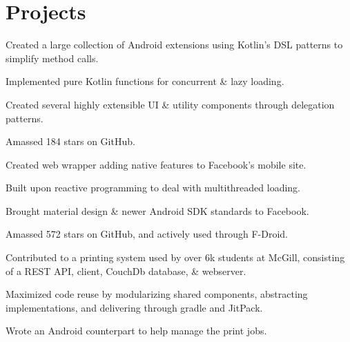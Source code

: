 \documentclass[]{allanwang-resume}
\begin{document}
\begin{minipage}[t]{0.66\textwidth}
	\sectionsep
	\section{Projects}

	\begin{tightemize}
		\item Created a large collection of Android extensions using Kotlin's DSL patterns to simplify method calls.
		\item Implemented pure Kotlin functions for concurrent \& lazy loading.
		\item Created several highly extensible UI \& utility components through delegation patterns.
		\item Amassed 184 stars on GitHub.
	\end{tightemize}

	\begin{tightemize}
		\item Created web wrapper adding native features to Facebook's mobile site.
		\item Built upon reactive programming to deal with multithreaded loading.
		\item Brought material design \& newer Android SDK standards to Facebook.
		\item Amassed 572 stars on GitHub, and actively used through F-Droid.
	\end{tightemize}

	\begin{tightemize}
		\item Contributed to a printing system used by over 6k students at McGill, consisting of a REST API, client, CouchDb database, \& webserver.
		\item Maximized code reuse by modularizing shared components, abstracting implementations, and delivering through gradle and JitPack.
		\item Wrote an Android counterpart to help manage the print jobs.
	\end{tightemize}	

\end{minipage}
\end{document}
